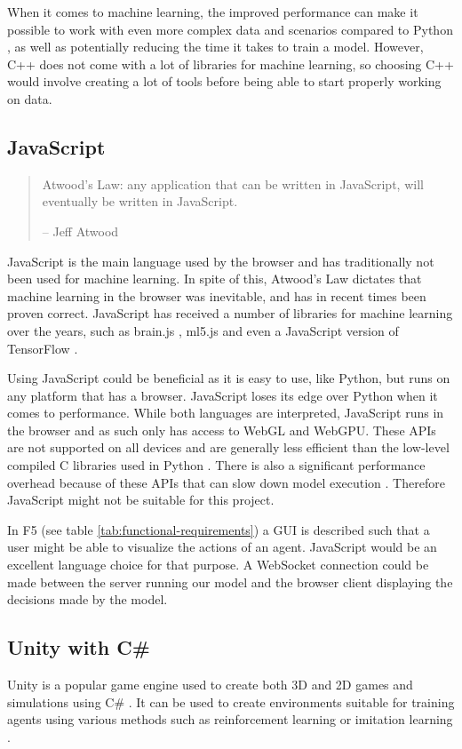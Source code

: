 When it comes to machine learning, the improved performance can make it possible to work with even more complex data and scenarios compared 
to Python \cite{C++VsPythonML}, as well as potentially reducing the time it takes to train a model. However, C++ does not come with a lot of libraries
for machine learning, so choosing C++ would involve creating a lot of tools before being able to start properly working on data.

\subsection{JavaScript}
\begin{quote}
    Atwood's Law: any application that can be written in JavaScript, will eventually be written in JavaScript.
    
    -- Jeff Atwood \cite{AtwoodsLaw}
\end{quote}

JavaScript is the main language used by the browser and has traditionally not been used for machine learning. In spite of this, Atwood's Law \cite{AtwoodsLaw} dictates
that machine learning in the browser was inevitable, and has in recent times been proven correct. JavaScript has received a number of libraries
for machine learning over the years, such as brain.js \cite{BrainJS}, ml5.js \cite{ML5JS} and even a JavaScript version of TensorFlow \cite{TensorFlowJS}.

Using JavaScript could be beneficial as it is easy to use, like Python, but runs on any platform that has a browser. JavaScript loses its edge over Python
when it comes to performance. While both languages are interpreted, JavaScript runs in the browser and as such only has access to WebGL and WebGPU. 
These APIs are not supported on all devices and are generally less efficient than the low-level compiled C libraries used in Python \cite{WebGPUvsCUDA}.
There is also a significant performance overhead because of these APIs that can slow down model execution \cite{DeepLearningInBrowsers}. Therefore JavaScript
might not be suitable for this project.

In F5 (see table \ref{tab:functional-requirements}) a GUI is described such that a user might be able to visualize the actions of an agent. JavaScript would be an 
excellent language choice for that purpose. A WebSocket connection could be made between the server running our model and the browser client displaying
the decisions made by the model.

\subsection{Unity with C\#}
Unity is a popular game engine used to create both 3D and 2D games and simulations using C\# \cite{Unity}. It can be used to create environments suitable
for training agents using various methods such as reinforcement learning or imitation learning \cite{UnityMLAgents}. 

